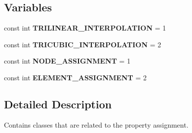\subsection*{Variables}
\begin{DoxyCompactItemize}
\item 
\hypertarget{namespaceassignment_a6496b1099d0ed23bec474b0f1e22b2a7}{
const int {\bfseries TRILINEAR\_\-INTERPOLATION} = 1}
\label{namespaceassignment_a6496b1099d0ed23bec474b0f1e22b2a7}

\item 
\hypertarget{namespaceassignment_a2992030988332894fd5fadfbea58dd2d}{
const int {\bfseries TRICUBIC\_\-INTERPOLATION} = 2}
\label{namespaceassignment_a2992030988332894fd5fadfbea58dd2d}

\item 
\hypertarget{namespaceassignment_a7f0efec30396aedeabda4c7814fb98bc}{
const int {\bfseries NODE\_\-ASSIGNMENT} = 1}
\label{namespaceassignment_a7f0efec30396aedeabda4c7814fb98bc}

\item 
\hypertarget{namespaceassignment_ab9c789a0403903c8878943f124276e7c}{
const int {\bfseries ELEMENT\_\-ASSIGNMENT} = 2}
\label{namespaceassignment_ab9c789a0403903c8878943f124276e7c}

\end{DoxyCompactItemize}


\subsection{Detailed Description}
Contains classes that are related to the property assignment. 